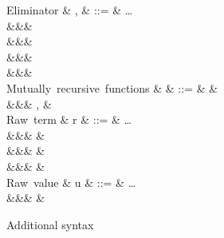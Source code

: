 \begin{figure}
\begin{syntaxfig}
\mbox{Eliminator}
&
\sigma, \tau
&
::=
&
\ldots
\\
&&&
\elimBoolTrue{\kappa}
\\
&&&
\elimBoolFalse{\kappa}
\\
&&&
\elimListSingleton{\branchNil{\kappa}}
\\
&&&
\elimListSingleton{\branchCons{\sigma}}
\\[2mm]
\mbox{Mutually recursive functions}
&
\delta
&
::=
&
\seqEmpty
&
\\
&&&
, \delta
&
\\[2mm]
\mbox{Raw term}
&
r
&
::=
&
\ldots
\\
&&&
\exLambda{\sigma}
&
\\
&&&
&
\\
&&&
&
\\[2mm]
\mbox{Raw value}
&
u
&
::=
&
\ldots
\\
&&&
\exClosure{\rho}{\delta}{\sigma}
&
\end{syntaxfig}
\caption{Additional syntax}
\end{figure}
